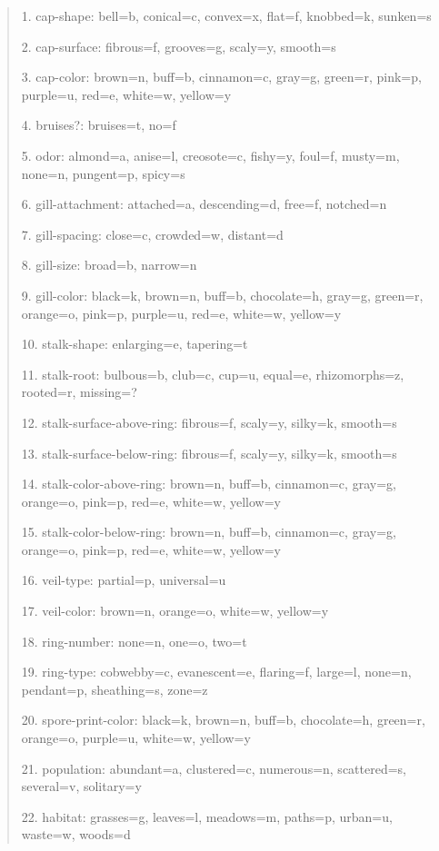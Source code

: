 \begin{quote}
   \footnotesize
   1. cap-shape: bell=b, conical=c, convex=x, flat=f, knobbed=k, sunken=s
   
   2. cap-surface: fibrous=f, grooves=g, scaly=y, smooth=s

   3. cap-color: brown=n, buff=b, cinnamon=c, gray=g, green=r, pink=p, purple=u, red=e, white=w, yellow=y

   4. bruises?: bruises=t, no=f

   5. odor: almond=a, anise=l, creosote=c, fishy=y, foul=f, musty=m, none=n, pungent=p, spicy=s

   6. gill-attachment: attached=a, descending=d, free=f, notched=n

   7. gill-spacing: close=c, crowded=w, distant=d

   8. gill-size: broad=b, narrow=n

   9. gill-color: black=k, brown=n, buff=b, chocolate=h, gray=g, green=r, orange=o, pink=p, purple=u, red=e, white=w, yellow=y

   10. stalk-shape: enlarging=e, tapering=t

   11. stalk-root: bulbous=b, club=c, cup=u, equal=e, rhizomorphs=z, rooted=r, missing=?

   12. stalk-surface-above-ring: fibrous=f, scaly=y, silky=k, smooth=s

   13. stalk-surface-below-ring: fibrous=f, scaly=y, silky=k, smooth=s

   14. stalk-color-above-ring: brown=n, buff=b, cinnamon=c, gray=g, orange=o, pink=p, red=e, white=w, yellow=y

   15. stalk-color-below-ring: brown=n, buff=b, cinnamon=c, gray=g, orange=o, pink=p, red=e, white=w, yellow=y

   16. veil-type: partial=p, universal=u

   17. veil-color: brown=n, orange=o, white=w, yellow=y

   18. ring-number: none=n, one=o, two=t

   19. ring-type: cobwebby=c, evanescent=e, flaring=f, large=l, none=n, pendant=p, sheathing=s, zone=z

   20. spore-print-color: black=k, brown=n, buff=b, chocolate=h, green=r, orange=o, purple=u, white=w, yellow=y

   21. population: abundant=a, clustered=c, numerous=n, scattered=s, several=v, solitary=y

   22. habitat: grasses=g, leaves=l, meadows=m, paths=p, urban=u, waste=w, woods=d
\end{quote}


